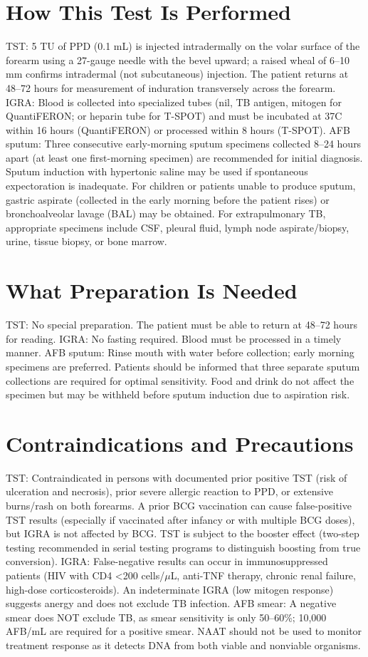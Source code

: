 \section*{How This Test Is Performed}
TST: 5 TU of PPD (0.1 mL) is injected intradermally on the volar surface of the forearm using a 27-gauge needle with the bevel upward; a raised wheal of 6--10 mm confirms intradermal (not subcutaneous) injection. The patient returns at 48--72 hours for measurement of induration transversely across the forearm. IGRA: Blood is collected into specialized tubes (nil, TB antigen, mitogen for QuantiFERON; or heparin tube for T-SPOT) and must be incubated at 37\textdegree{}C within 16 hours (QuantiFERON) or processed within 8 hours (T-SPOT). AFB sputum: Three consecutive early-morning sputum specimens collected 8--24 hours apart (at least one first-morning specimen) are recommended for initial diagnosis. Sputum induction with hypertonic saline may be used if spontaneous expectoration is inadequate. For children or patients unable to produce sputum, gastric aspirate (collected in the early morning before the patient rises) or bronchoalveolar lavage (BAL) may be obtained. For extrapulmonary TB, appropriate specimens include CSF, pleural fluid, lymph node aspirate/biopsy, urine, tissue biopsy, or bone marrow.

\section*{What Preparation Is Needed}
TST: No special preparation. The patient must be able to return at 48--72 hours for reading. IGRA: No fasting required. Blood must be processed in a timely manner. AFB sputum: Rinse mouth with water before collection; early morning specimens are preferred. Patients should be informed that three separate sputum collections are required for optimal sensitivity. Food and drink do not affect the specimen but may be withheld before sputum induction due to aspiration risk.

\section*{Contraindications and Precautions}
TST: Contraindicated in persons with documented prior positive TST (risk of ulceration and necrosis), prior severe allergic reaction to PPD, or extensive burns/rash on both forearms. A prior BCG vaccination can cause false-positive TST results (especially if vaccinated after infancy or with multiple BCG doses), but IGRA is not affected by BCG. TST is subject to the booster effect (two-step testing recommended in serial testing programs to distinguish boosting from true conversion). IGRA: False-negative results can occur in immunosuppressed patients (HIV with CD4 <200 cells/$\mu$L, anti-TNF therapy, chronic renal failure, high-dose corticosteroids). An indeterminate IGRA (low mitogen response) suggests anergy and does not exclude TB infection. AFB smear: A negative smear does NOT exclude TB, as smear sensitivity is only 50--60\%; 10,000 AFB/mL are required for a positive smear. NAAT should not be used to monitor treatment response as it detects DNA from both viable and nonviable organisms.

